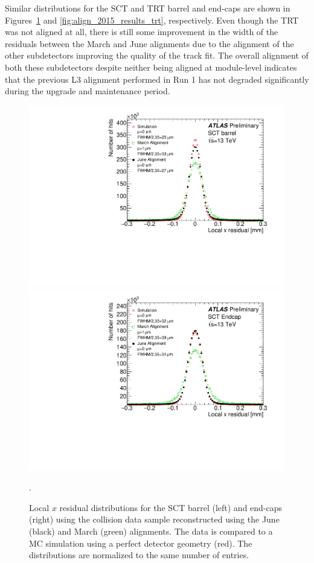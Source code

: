 Similar distributions for the SCT and TRT barrel and end-caps are shown in Figures~\ref{fig:align_2015_results_sct} and \ref{fig:align_2015_results_trt}, respectively.
Even though the TRT was not aligned at all, there is still some improvement in the width of the residuals between the March and June alignments due to the alignment of the other subdetectors improving the quality of the track fit.
The overall alignment of both these subdetectors despite neither being aligned at module-level indicates that the previous L3 alignment performed in Run 1 has not degraded significantly during the upgrade and maintenance period.

\begin{figure}[htbp]
  \includegraphics[width=.48\textwidth]{figs/alignment/align2015/SCTX}
  \includegraphics[width=.48\textwidth]{figs/alignment/align2015/SCTECX}
  \caption{Local $x$ residual distributions for the SCT barrel (left) and end-caps (right) using the  collision data sample reconstructed using the June (black) and March (green) alignments.  The data is compared to a MC simulation using a perfect detector geometry (red).  The distributions are normalized to the same number of entries.}
  \label{fig:align_2015_results_sct}.
\end{figure}


